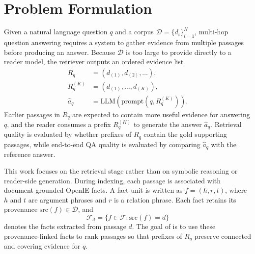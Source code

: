 %
%
%

\section{Problem Formulation}
\label{sec:problem}

Given a natural language question $q$ and a corpus
$\mathcal{D}=\{d_i\}_{i=1}^{N}$, multi-hop question answering requires a
system to gather evidence from multiple passages before producing an
answer. Because $\mathcal{D}$ is too large to provide directly to a
reader model, the retriever outputs an ordered evidence list
\[
\begin{aligned}
R_q &= (d_{(1)},d_{(2)},\ldots), \\
R_q^{(K)} &= (d_{(1)},\ldots,d_{(K)}), \\
\hat{a}_q &= \mathrm{LLM}(\mathrm{prompt}(q,R_q^{(K)})).
\end{aligned}
\]
Earlier passages in $R_q$ are expected to contain more useful evidence
for answering $q$, and the reader consumes a prefix $R_q^{(K)}$ to
generate the answer $\hat{a}_q$. Retrieval quality is evaluated by
whether prefixes of $R_q$ contain the gold supporting passages, while
end-to-end QA quality is evaluated by comparing $\hat{a}_q$ with the
reference answer.

This work focuses on the retrieval stage rather than on symbolic
reasoning or reader-side generation. During indexing, each passage is
associated with document-grounded OpenIE facts. A fact unit is written as
$f=(h,r,t)$, where $h$ and $t$ are argument phrases and $r$ is a relation
phrase. Each fact retains its provenance
$\mathrm{src}(f)\in\mathcal{D}$, and
\[
\mathcal{F}_d=\{f\in\mathcal{F}: \mathrm{src}(f)=d\}
\]
denotes the facts extracted from passage $d$. The goal of
\methodname{} is to use these provenance-linked facts to rank passages
so that prefixes of $R_q$ preserve connected and covering evidence for
$q$.
